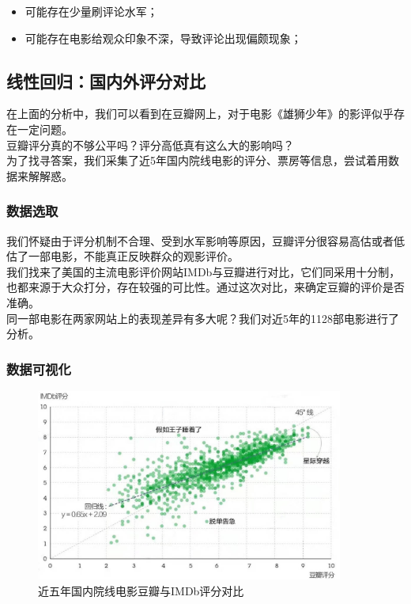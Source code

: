 \documentclass[12pt,a4paper,utf8]{article}
\begin{document}
\begin{itemize}
    \item 可能存在少量刷评论水军；
    \item 可能存在电影给观众印象不深，导致评论出现偏颇现象；
\end{itemize}

\subsection{线性回归：国内外评分对比}
在上面的分析中，我们可以看到在豆瓣网上，对于电影《雄狮少年》的影评似乎存在一定问题。\\

豆瓣评分真的不够公平吗？评分高低真有这么大的影响吗？\\

为了找寻答案，我们采集了近5年国内院线电影的评分、票房等信息，尝试着用数据来解解惑。\\

\subsubsection{数据选取}
我们怀疑由于评分机制不合理、受到水军影响等原因，豆瓣评分很容易高估或者低估了一部电影，不能真正反映群众的观影评价。\\

我们找来了美国的主流电影评价网站IMDb与豆瓣进行对比，它们同采用十分制，也都来源于大众打分，存在较强的可比性。通过这次对比，来确定豆瓣的评价是否准确。\\

同一部电影在两家网站上的表现差异有多大呢？我们对近5年的1128部电影进行了分析。\\

\subsubsection{数据可视化}

\begin{figure}[H]
    \centering
    \includegraphics[width=0.9\textwidth]{images/douban-imdb.jpg}  
    \caption{近五年国内院线电影豆瓣与IMDb评分对比}
\end{figure}  
\end{document}
